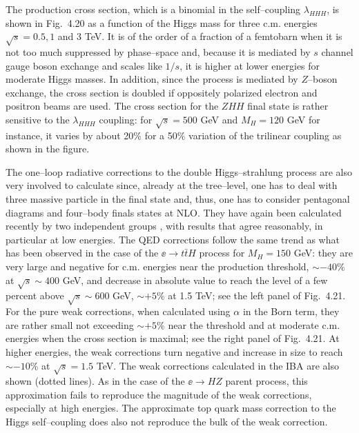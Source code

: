 {The production cross section, which is a binomial in the self--coupling
$\lambda_{HHH}$,  is shown in Fig.~4.20 as a function of the Higgs mass for
three c.m. energies $\sqrt{s} = 0.5,1$ and 3 TeV. It is of the order of  a
fraction of a femtobarn when it is not too much suppressed by phase--space and,
because it is mediated by $s$ channel gauge boson exchange and scales like
$1/s$, it is higher at lower energies for moderate Higgs masses.  In addition,
since the process is mediated by $Z$--boson exchange, the cross section is
doubled if oppositely polarized electron and positron beams are used. The cross
section 
for the $ZHH$ final state is rather sensitive to the $\lambda_{HHH}$ coupling: 
for $\sqrt{s}\!=\!500$ GeV and $M_H\!=\!120$ GeV for instance, it varies by 
about 20\% for a 50\% variation of the trilinear coupling as shown in the 
figure.

\begin{figure}[!h]
\begin{center}
\vspace*{-2.3cm}
\hspace*{-1.cm}
\end{center}
\vspace*{-14.3cm}
\vspace*{-.3cm}
\end{figure}

The one--loop radiative corrections to the double Higgs--strahlung process are
also very involved to calculate since, already at the tree--level, one has to
deal with three massive particle in the final state and, thus, one has to
consider pentagonal diagrams and four--body finals states at NLO. They have
again been calculated recently by two independent groups \cite{RCZHH1,RCZHH2},
with results that agree reasonably, in particular at low energies. The QED
corrections follow the same trend as what has been observed in the case of the
$\ee \to t\bar{t}H$ process for $M_H=150$ GeV: they are very large and negative
for c.m.  energies near the production threshold, $\sim -40\%$ at $\sqrt{s}
\sim 400$ GeV, and decrease in absolute value to reach the level of a few
percent above $\sqrt{s} \sim 600$ GeV, $\sim +5\%$ at 1.5 TeV; see the left
panel of Fig.~4.21.  For the pure weak corrections, when calculated using
$\alpha$ in the Born term, they are rather small not exceeding $\sim +5\%$ near
the threshold and at moderate c.m. energies when the cross section is maximal;
see the right panel of Fig.~4.21. At higher energies, the weak corrections turn
negative and increase in size to reach $\sim -10\%$ at $\sqrt{s}=1.5$ TeV. The
weak corrections calculated in the IBA are also shown (dotted lines). As in the
case of the $\ee \to HZ$ parent process, this approximation fails to reproduce
the magnitude of the weak corrections, especially at high energies. The
approximate top quark mass correction to the Higgs self--coupling does also not
reproduce the bulk of the weak correction.  

}
